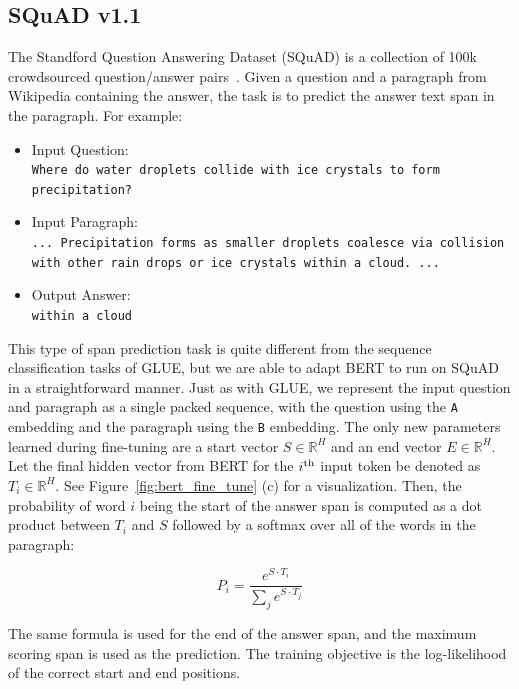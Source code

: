 \subsection{SQuAD v1.1}
\label{sec:squad}

The Standford Question Answering Dataset (SQuAD) is a collection of 100k crowdsourced question/answer pairs~\cite{rajpurkar-etal:2016:_squad}. Given a question and a paragraph from Wikipedia containing the answer, the task is to predict the answer text span in the paragraph. For example: 

\begin{itemize}
\item Input Question: \\{\tt {\scriptsize  Where do water droplets collide with ice crystals to form precipitation?}}
\item Input Paragraph: \\{\tt {\scriptsize  ... Precipitation forms as smaller droplets coalesce via collision with other rain drops or ice crystals within a cloud. ...}}
\item Output Answer: \\ {\tt {\scriptsize  within a cloud}}
\end{itemize}

This type of span prediction task is quite different from the sequence classification tasks of GLUE, but we are able to adapt BERT to run on SQuAD in a straightforward manner. Just as with GLUE, we represent the input question and paragraph as a single packed sequence, with the question using the {\tt A} embedding and the paragraph using the {\tt B} embedding. The only new parameters learned during fine-tuning are a start vector $S \in \mathbb{R}^H$ and an end vector $E \in \mathbb{R}^H$. Let the final hidden vector from BERT for the $i^{\rm th}$ input token be denoted as $T_i \in \mathbb{R}^H$. See Figure~\ref{fig:bert_fine_tune} (c) for a visualization. Then, the probability of word $i$ being the start of the answer span is computed as a dot product between $T_i$ and $S$ followed by a softmax over all of the words in the paragraph:

\[P_i = \frac{e^{S{\cdot}T_i}}{\sum_j e^{S{\cdot}T_j}}\]

The same formula is used for the end of the answer span, and the maximum scoring span is used as the prediction. The training objective is the log-likelihood of the correct start and end positions. 



